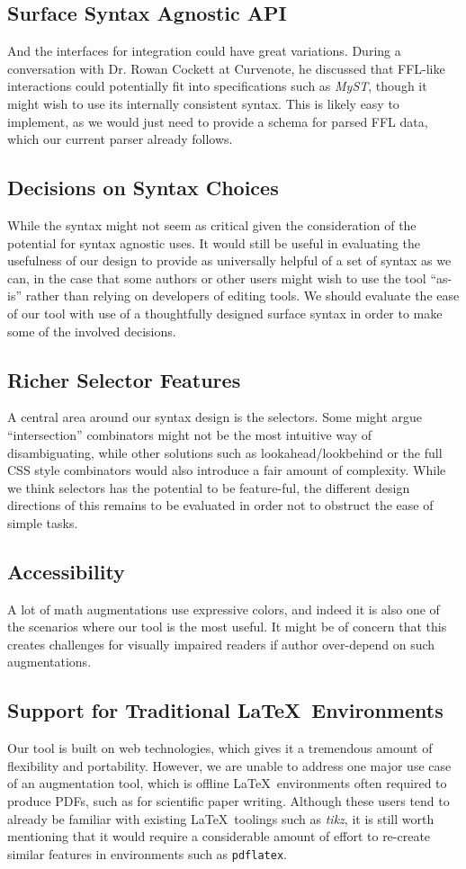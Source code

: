 \documentclass{article}
\begin{document}
\begin{multicols*}{2}
  \subsection*{Surface Syntax Agnostic API}
  And the interfaces for integration could have great variations. During a conversation
  with Dr. Rowan Cockett at Curvenote, he discussed that FFL-like interactions could
  potentially fit into specifications such as \textit{MyST}\cite{MyST}, though it might
  wish to use its internally consistent syntax. This is likely easy to implement,
  as we would just need to provide a schema for parsed FFL data, which our current
  parser already follows.
  \subsection*{Decisions on Syntax Choices}
  While the syntax might not seem as critical given the consideration of the potential
  for syntax agnostic uses. It would still be useful in evaluating the usefulness of
  our design to provide as universally helpful of a set of syntax as we can, in the case
  that some authors or other users might wish to use the tool ``as-is'' rather than
  relying on developers of editing tools. We should evaluate the ease of our tool
  with use of a thoughtfully designed surface syntax in order to make some of the
  involved decisions.
  \subsection*{Richer Selector Features}
  A central area around our syntax design is the selectors.
  Some might argue ``intersection'' combinators might not be the most intuitive
  way of disambiguating, while other solutions such as lookahead/lookbehind or
  the full CSS style combinators would also introduce a fair amount of complexity.
  While we think selectors has the potential to be feature-ful, the different design
  directions of this remains to be evaluated in order not to obstruct the ease of
  simple tasks.
  \subsection*{Accessibility}
  A lot of math augmentations use expressive colors, and indeed it is also one of
  the scenarios where our tool is the most useful. It might be of concern that this creates
  challenges for visually impaired readers if author over-depend on such augmentations.
  \subsection*{Support for Traditional \LaTeX\ Environments}
  Our tool is built on web technologies, which gives it a tremendous amount of flexibility
  and portability. However, we are unable to address one major use case of an augmentation
  tool, which is offline \LaTeX\ environments often required to produce PDFs, such as
  for scientific paper writing. Although these users tend to already be familiar with
  existing \LaTeX\ toolings such as \textit{tikz}, it is still worth mentioning that it would
  require a considerable amount of effort to re-create similar features in environments
  such as \texttt{pdflatex}.

\end{multicols*}
\end{document}
